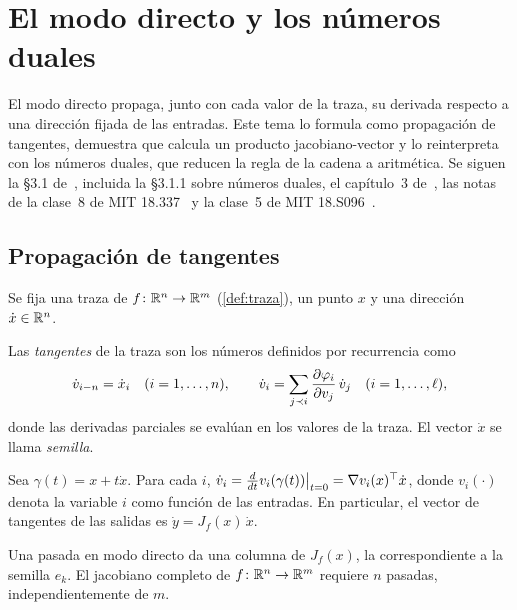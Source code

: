 \chapter{El modo directo y los números duales}
\label{tema:2}

El modo directo propaga, junto con cada valor de la traza, su derivada respecto a una dirección fijada de las entradas. Este tema lo formula como propagación de tangentes, demuestra que calcula un producto jacobiano-vector y lo reinterpreta con los números duales, que reducen la regla de la cadena a aritmética. Se siguen la §3.1 de~\cite{baydin}, incluida la §3.1.1 sobre números duales, el capítulo~3 de~\cite{gw}, las notas de la clase~8 de MIT 18.337~\cite{mit18337} y la clase~5 de MIT 18.S096~\cite{mit18s096}.

\section{Propagación de tangentes}

Se fija una traza de $f\colon\mathbb{R}^{n}\to\mathbb{R}^{m}$ (\cref{def:traza}), un punto $x$ y una dirección $\dot x\in\mathbb{R}^{n}$.

\begin{definicion}[Tangentes]\label{def:tangente}
Las \emph{tangentes} de la traza son los números definidos por recurrencia como
\[
\dot v_{i-n}=\dot x_i\quad(i=1,\dots,n),\qquad
\dot v_i=\sum_{j\prec i}\frac{\partial\varphi_i}{\partial v_j}\,\dot v_j\quad(i=1,\dots,\ell),
\]
donde las derivadas parciales se evalúan en los valores de la traza. El vector $\dot x$ se llama \emph{semilla}.
\end{definicion}

\begin{teorema}\label{teo:directo}
Sea $\gamma(t)=x+t\dot x$. Para cada $i$, $\dot v_i=\frac{d}{dt}v_i(\gamma(t))\big|_{t=0}=\nabla v_i(x)^{\top}\dot x$, donde $v_i(\cdot)$ denota la variable $i$ como función de las entradas. En particular, el vector de tangentes de las salidas es $\dot y=J_f(x)\,\dot x$.
\end{teorema}

\addtocounter{definicion}{1}%

\begin{corolario}\label{cor:coste-directo}
Una pasada en modo directo da una columna de $J_f(x)$, la correspondiente a la semilla $e_k$. El jacobiano completo de $f\colon\mathbb{R}^{n}\to\mathbb{R}^{m}$ requiere $n$ pasadas, independientemente de $m$.
\end{corolario}

